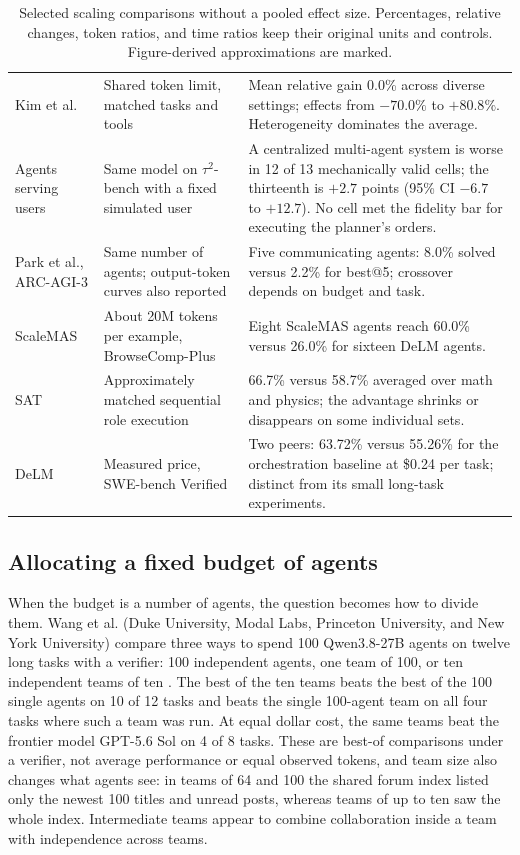 \begin{table}[t]
\begin{tabularx}{\textwidth}{@{}p{}p{}Y@{}}
Kim et al. \citep{kim-scaling-agent-systems} & Shared token limit, matched tasks and tools & Mean relative gain 0.0\% across diverse settings; effects from $-70.0\%$ to $+80.8\%$. Heterogeneity dominates the average.\\\addlinespace[2pt]
Agents serving users \citep{collaboration-serving-users} & Same model on $\tau^2$-bench with a fixed simulated user & A centralized multi-agent system is worse in 12 of 13 mechanically valid cells; the thirteenth is $+2.7$ points (95\% CI $-6.7$ to $+12.7$). No cell met the fidelity bar for executing the planner's orders.\\\addlinespace[2pt]
Park et al., ARC-AGI-3 \citep{test-time-communication} & Same number of agents; output-token curves also reported & Five communicating agents: 8.0\% solved versus 2.2\% for best@5; crossover depends on budget and task.\\\addlinespace[2pt]
ScaleMAS \citep{scalemas-substrate} & About 20M tokens per example, BrowseComp-Plus & Eight ScaleMAS agents reach 60.0\% versus 26.0\% for sixteen DeLM agents.\\\addlinespace[2pt]
SAT \citep{sat-teams} & Approximately matched sequential role execution & 66.7\% versus 58.7\% averaged over math and physics; the advantage shrinks or disappears on some individual sets.\\\addlinespace[2pt]
DeLM \citep{delm-shared-context} & Measured price, SWE-bench Verified & Two peers: 63.72\% versus 55.26\% for the orchestration baseline at \$0.24 per task; distinct from its small long-task experiments.\\
\bottomrule
\end{tabularx}
\caption{Selected scaling comparisons without a pooled effect size. Percentages, relative changes, token ratios, and time ratios keep their original units and controls. Figure-derived approximations are marked.}
\label{tab:scaling}
\end{table}

\subsection{Allocating a fixed budget of agents}
When the budget is a number of agents, the question becomes how to divide them. Wang et al. (Duke University, Modal Labs, Princeton University, and New York University) compare three ways to spend 100 Qwen3.8-27B agents on twelve long tasks with a verifier: 100 independent agents, one team of 100, or ten independent teams of ten \citep{parallel-agent-teams}. The best of the ten teams beats the best of the 100 single agents on 10 of 12 tasks and beats the single 100-agent team on all four tasks where such a team was run. At equal dollar cost, the same teams beat the frontier model GPT-5.6 Sol on 4 of 8 tasks. These are best-of comparisons under a verifier, not average performance or equal observed tokens, and team size also changes what agents see: in teams of 64 and 100 the shared forum index listed only the newest 100 titles and unread posts, whereas teams of up to ten saw the whole index. Intermediate teams appear to combine collaboration inside a team with independence across teams.

